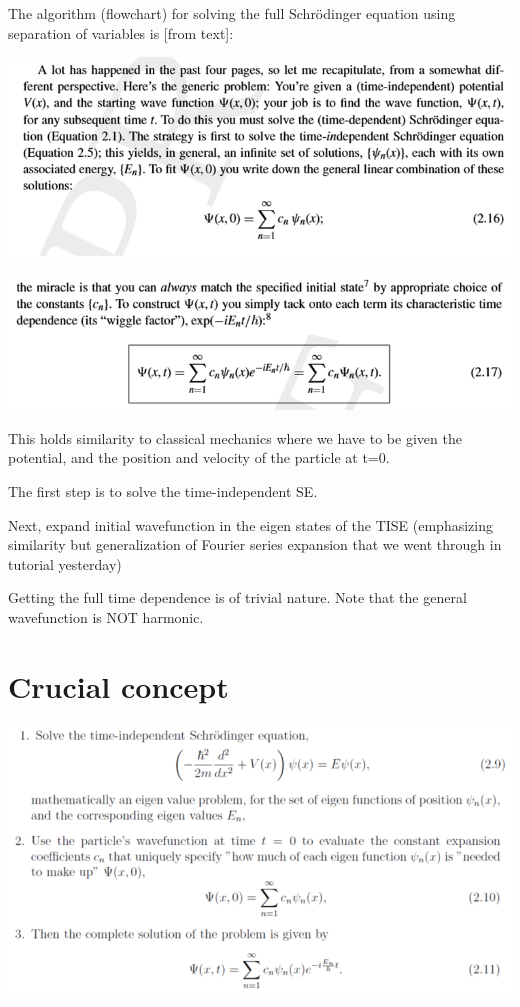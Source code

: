 \documentclass{article}
\begin{document}
The algorithm (flowchart) for solving the full Schrödinger equation using separation of variables is [from text]:

\includegraphics[width = 0.8 \textwidth]{Lecture05/1.png}

\includegraphics[width = 0.8 \textwidth]{Lecture05/2.png}

This holds similarity to classical mechanics where we have to be given the potential, and the position and velocity of the particle at t=0.

The first step is to solve the time-independent SE.

Next, expand initial wavefunction in the eigen states of the TISE (emphasizing similarity but generalization of Fourier series expansion that we went through in tutorial yesterday)

Getting the full time dependence is of trivial nature. Note that the general wavefunction is NOT harmonic. 

\section*{Crucial concept}

\includegraphics[width = 0.8 \textwidth]{Lecture05/3.png}
\end{document}
